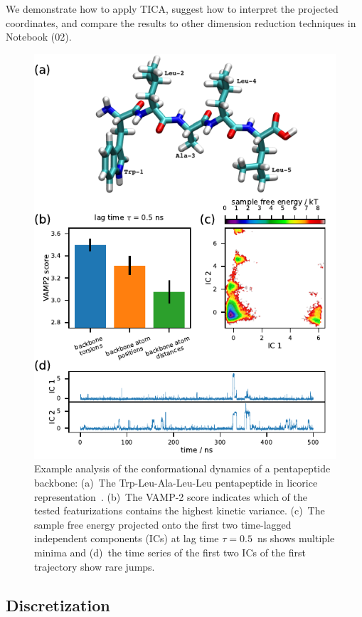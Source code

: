 \documentclass[9pt,tutorial]{livecoms}
\begin{document}
We demonstrate how to apply TICA, suggest how to interpret the projected coordinates, and compare the results to other dimension reduction techniques in Notebook (02).

\begin{figure}
\includegraphics{figure_3}
\caption{Example analysis of the conformational dynamics of a pentapeptide backbone:
(a)~The Trp-Leu-Ala-Leu-Leu pentapeptide in licorice representation~\cite{vmd}.
(b)~The VAMP-2 score indicates which of the tested featurizations contains the highest kinetic variance.
(c)~The sample free energy projected onto the first two time-lagged independent components (ICs) at lag time $\tau=0.5$~ns shows multiple minima and
(d)~the time series of the first two ICs of the first trajectory show rare jumps.}
\label{fig:io-to-tica}
\end{figure}

\subsection{Discretization}
\end{document}
